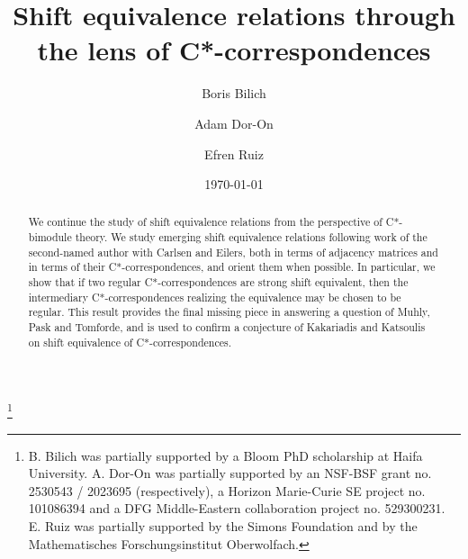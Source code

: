 \documentclass[11pt, letterpaper,final]{amsart}
\theoremstyle{definition}
\begin{document}
	\title[Shift equivalence relations and C*-correspondences]{Shift equivalence relations through \\ the lens of C*-correspondences}
	
	        \author{Boris Bilich}
        \address{Department of Mathematics, University of Haifa, Haifa, Israel, and Department of Mathematics, University of G\"ottingen, G\"ottingen, Germany.}
        
        \author{Adam Dor-On}
        \address{Department of Mathematics, University of Haifa, Mount Carmel, Haifa 3103301, Israel.}
				
				\author{Efren Ruiz}
        \address{Department of Mathematics\\University of Hawaii,
Hilo\\200 W. Kawili St.\\
Hilo, Hawaii\\
96720-4091 USA}
        \date{\today}


        
\begin{abstract}
We continue the study of shift equivalence relations from the perspective of C*-bimodule theory. We study emerging shift equivalence relations following work of the second-named author with Carlsen and Eilers, both in terms of adjacency matrices and in terms of their C*-correspondences, and orient them when possible. In particular, we show that if two regular C*-correspondences are strong shift equivalent, then the intermediary C*-correspondences realizing the equivalence may be chosen to be regular. This result provides the final missing piece in answering a question of Muhly, Pask and Tomforde, and is used to confirm a conjecture of Kakariadis and Katsoulis on shift equivalence of C*-correspondences.  
\end{abstract}

\thanks{B. Bilich was partially supported by a Bloom PhD scholarship at Haifa University. A. Dor-On was partially supported by an NSF-BSF grant no. 2530543 / 2023695 (respectively), a Horizon Marie-Curie SE project no. 101086394 and a DFG Middle-Eastern collaboration project no. 529300231. E. Ruiz was partially supported by the Simons Foundation and by the Mathematisches Forschungsinstitut Oberwolfach.}
\end{document}
